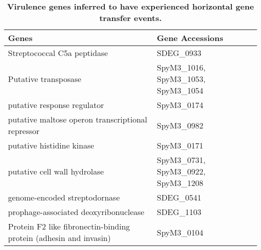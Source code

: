 \documentclass[10pt]{article}
\providecommand{\tabularnewline}{\\}
\begin{document}
\begin{table}[!ht]
\caption{
{\bf Virulence genes inferred to have experienced horizontal gene transfer
events.}}
\noindent \begin{centering}
\begin{tabular}{ll}
\hline 
Genes & Gene Accessions\tabularnewline
\hline 
Streptococcal C5a peptidase & SDEG\_0933\\ 
Putative transposase & SpyM3\_1016, SpyM3\_1053, SpyM3\_1054\\
putative response regulator & SpyM3\_0174\\
putative maltose operon transcriptional repressor & SpyM3\_0982\\ 
putative histidine kinase & SpyM3\_0171\\
putative cell wall hydrolase & SpyM3\_0731, SpyM3\_0922, SpyM3\_1208\\
genome-encoded streptodornase & SDEG\_0541\\
prophage-associated deoxyribonuclease & SDEG\_1103\\
Protein F2 like fibronectin-binding protein (adhesin and invasin) & SpyM3\_0104\\
\hline 
\end{tabular}
\par\end{centering}
\label{tab:virhgt}
\end{table}
\end{document}
